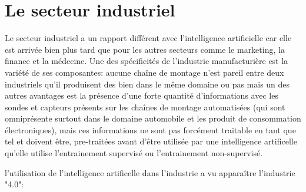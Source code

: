    \section{Le secteur industriel}
        Le secteur industriel a un rapport différent avec l'intelligence artificielle car elle est arrivée 
        bien plus tard que pour les autres secteurs comme le marketing, la finance et la médecine.
        Une des spécificités de l'industrie manufacturière est la variété de ses composantes: 
        aucune chaîne de montage n'est pareil entre deux industriels qu'il produisent des bien 
        dans le même domaine ou pas mais un des autres avantages est la présence d'une forte quantité 
        d'informations avec les sondes et capteurs présents sur les chaînes de montage automatisées 
        (qui sont omniprésente surtout dans le domaine automobile et les produit de consommation électroniques), 
        mais ces informations ne sont pas forcément traitable en tant que tel et doivent être, pre-traitées
        avant d'être utilisée par une intelligence artificelle qu'elle utilise l'entrainement 
        supervisé ou l'entrainement non-supervisé. \newline

        l'utilisation de l'intelligence artificelle dans l'industrie a vu apparaître 
        l'industrie "4.0":


